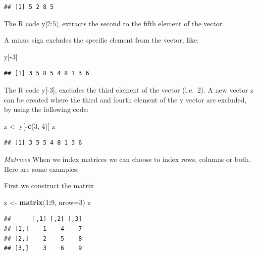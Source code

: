 \documentclass[]{book}
\newenvironment{Shaded}{\begin{snugshade}}{\end{snugshade}}
\newcommand{\KeywordTok}[1]{\textcolor[rgb]{0.13,0.29,0.53}{\textbf{#1}}}
\newcommand{\DataTypeTok}[1]{\textcolor[rgb]{0.13,0.29,0.53}{#1}}
\newcommand{\DecValTok}[1]{\textcolor[rgb]{0.00,0.00,0.81}{#1}}
\newcommand{\StringTok}[1]{\textcolor[rgb]{0.31,0.60,0.02}{#1}}
\newcommand{\OperatorTok}[1]{\textcolor[rgb]{0.81,0.36,0.00}{\textbf{#1}}}
\newcommand{\NormalTok}[1]{#1}
\theoremstyle{definition}
\theoremstyle{definition}
\theoremstyle{definition}
\theoremstyle{remark}
\begin{document}
\begin{verbatim}
## [1] 5 2 8 5
\end{verbatim}

The R code y{[}2:5{]}, extracts the second to the fifth element of the
vector.

A minus sign excludes the specific element from the vector, like:

\begin{Shaded}
\begin{Highlighting}[]
\NormalTok{y[}\OperatorTok{-}\DecValTok{3}\NormalTok{]}
\end{Highlighting}
\end{Shaded}

\begin{verbatim}
## [1] 3 5 8 5 4 8 1 3 6
\end{verbatim}

The R code y{[}-3{]}, excludes the third element of the vector (i.e.~2).
A new vector z can be created where the third and fourth element of the
y vector are excluded, by using the following code:

\begin{Shaded}
\begin{Highlighting}[]
\NormalTok{z <-}\StringTok{ }\NormalTok{y[}\OperatorTok{-}\KeywordTok{c}\NormalTok{(}\DecValTok{3}\NormalTok{, }\DecValTok{4}\NormalTok{)]}
\NormalTok{z}
\end{Highlighting}
\end{Shaded}

\begin{verbatim}
## [1] 3 5 5 4 8 1 3 6
\end{verbatim}

\emph{Matrices} When we index matrices we can choose to index rows,
columns or both. Here are some examples:

First we construct the matrix

\begin{Shaded}
\begin{Highlighting}[]
\NormalTok{z <-}\StringTok{ }\KeywordTok{matrix}\NormalTok{(}\DecValTok{1}\OperatorTok{:}\DecValTok{9}\NormalTok{, }\DataTypeTok{nrow=}\DecValTok{3}\NormalTok{)}
\NormalTok{z}
\end{Highlighting}
\end{Shaded}

\begin{verbatim}
##      [,1] [,2] [,3]
## [1,]    1    4    7
## [2,]    2    5    8
## [3,]    3    6    9
\end{verbatim}
\end{document}
